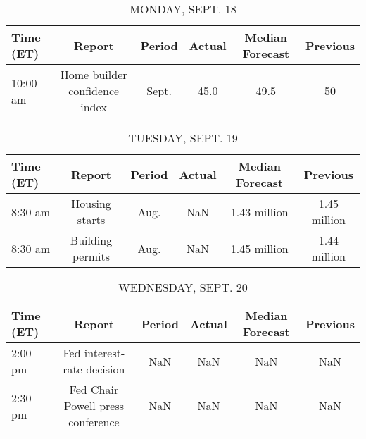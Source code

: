 \documentclass{article}%
\begin{document}
%
\normalsize%


\begin{table}[htbp]%
\caption{MONDAY, SEPT. 18}%
\centering%
\begin{adjustbox}{width=1\textwidth}%
\begin{tabular}{lccccc}
\toprule
Time (ET) &                        Report & Period & Actual & Median Forecast & Previous \\
\midrule
 10:00 am & Home builder confidence index &  Sept. &   45.0 &            49.5 &       50 \\
\bottomrule
\end{tabular}
%
\end{adjustbox}%
\end{table}

%


\begin{table}[htbp]%
\caption{TUESDAY, SEPT. 19}%
\centering%
\begin{adjustbox}{width=1\textwidth}%
\begin{tabular}{lccccc}
\toprule
Time (ET) &           Report & Period & Actual & Median Forecast &     Previous \\
\midrule
  8:30 am &   Housing starts &   Aug. &    NaN &    1.43 million & 1.45 million \\
  8:30 am & Building permits &   Aug. &    NaN &    1.45 million & 1.44 million \\
\bottomrule
\end{tabular}
%
\end{adjustbox}%
\end{table}

%


\begin{table}[htbp]%
\caption{WEDNESDAY, SEPT. 20}%
\centering%
\begin{adjustbox}{width=1\textwidth}%
\begin{tabular}{lccccc}
\toprule
Time (ET) &                            Report & Period & Actual & Median Forecast & Previous \\
\midrule
  2:00 pm &        Fed interest-rate decision &    NaN &    NaN &             NaN &      NaN \\
  2:30 pm & Fed Chair Powell press conference &    NaN &    NaN &             NaN &      NaN \\
\bottomrule
\end{tabular}
%
\end{adjustbox}%
\end{table}
\end{document}
